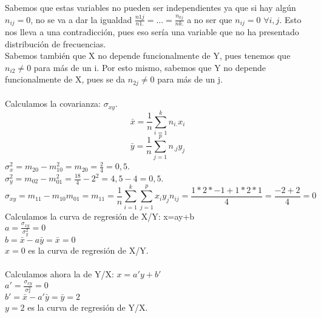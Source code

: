     Sabemos que estas variables no pueden ser independientes ya que si hay algún $n_{ij}=0$, no se va a dar la igualdad $\frac{n1j}{n1.} = ... = \frac{n_{kj}}{nk.}$ a no ser que $n_{ij}=0$ $\forall i,j$. Esto nos lleva a una contradicción, pues eso sería una variable que no ha presentado distribución de frecuencias. \\
    Sabemos también que X no depende funcionalmente de Y, pues tenemos que $n_{i2} \not = 0$ para más de un i. Por esto mismo, sabemos que Y no depende funcionalmente de X, pues se da $n_{2j} \neq 0$ para más de un j. \\ \\
    Calculamos la covarianza: $\sigma_{xy}$.\\
    \[\bar{x}=\frac{1}{n}\sum_{i=1}^{k}n_{i.}x_i\] 
    \[\bar{y}=\frac{1}{n}\sum_{j=1}^{p}n_{.j}y_j\]
    $\sigma_x^2 = m_{20}-m_{10}^2 = m_{20} = \frac{2}{4} = 0,5$. \\
    $\sigma_y^2 = m_{02}-m_{01}^2 = \frac{18}{4} -2^2=4,5 - 4 = 0,5$. \\
    \[\sigma_{xy} = m_{11} - m_{10}m_{01} = m_{11} = \frac{1}{n} \sum_{i=1}^{k}\sum_{j=1}^{p} x_iy_jn_{ij} = \frac{1*2*-1 + 1*2*1}{4} = \frac{-2+2}{4} = 0 \]
    Calculamos la curva de regresión de X/Y: x=ay+b \\
    $a= \frac{\sigma_{xy}}{\sigma_{y}^2} = 0$ \\
    $b = \bar{x}-a\bar{y} = \bar{x} = 0$ \\ 
    $x=0$ es la curva de regresión de X/Y. \\ \\
    Calculamos ahora la de Y/X: $x=a'y+b'$ \\
    $a' = \frac{\sigma_{xy}}{\sigma_x^2} = 0$ \\
    $b' = \bar{x}-a'\bar{y} = \bar{y} = 2$ \\
    $y=2$ es la curva de regresión de Y/X. \\ \\
    